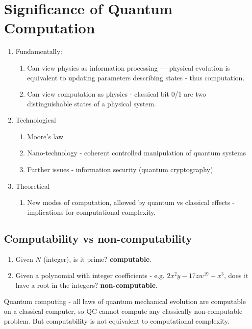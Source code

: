 
\chapter{Significance of Quantum Computation}
\label{cha:signf-quant-comp}

\begin{enumerate}
\item Fundamentally:
  \begin{enumerate}
  \item Can view physics as information processing --- physical
    evolution is equivalent to updating parameters describing states
    - thus computation.
  \item Can view computation as physics - classical bit 0/1 are two
    distinguishable states of a physical system.
  \end{enumerate}
\item Technological
  \begin{enumerate}
  \item Moore's law
  \item Nano-technology - coherent controlled manipulation of quantum systems
  \item Further issues - information security (quantum cryptography)
  \end{enumerate}
\item Theoretical
  \begin{enumerate}
  \item New modes of computation, allowed by quantum vs classical
    effects - implications for computational complexity.
  \end{enumerate}
\end{enumerate}

\section{Computability vs non-computability}
\label{sec:computability-vs-non}

\begin{enumerate}
\item Given $N$ (integer), is it prime? \textbf{computable}.
\item Given a polynomial with integer coefficients - e.g. $2x^{2}y -
  17zw^{19} + x^{3}$, does it have a root in the integers?  \textbf{non-computable}.
\end{enumerate}

Quantum computing - all laws of quantum mechanical evolution are
computable on a classical computer, so QC cannot compute any
classically non-computable problem.  But computability is not
equivalent to computational complexity.

